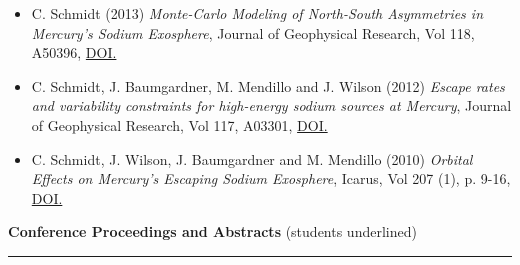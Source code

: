 \documentclass[12pt]{report}
\begin{document}
\begin{itemize}
  \item C. Schmidt (2013) \textit{Monte-Carlo Modeling of North-South Asymmetries in Mercury's Sodium Exosphere}, Journal of Geophysical Research, Vol 118, A50396, \href{https://doi.org/10.1002/jgra.50396}{DOI.}
  \item C. Schmidt, J. Baumgardner, M. Mendillo and J. Wilson (2012) \textit{Escape rates and variability constraints for high-energy sodium sources at Mercury}, Journal of Geophysical Research, Vol 117, A03301, \href{https://doi.org/10.1029/2011JA017217}{DOI.}
  \item C. Schmidt, J. Wilson, J. Baumgardner and M. Mendillo (2010) \textit{Orbital Effects on Mercury's Escaping Sodium Exosphere}, Icarus, Vol 207 (1), p. 9-16, \href{https://doi.org/10.1016/j.icarus.2009.10.017}{DOI.}
 \end{itemize}
\vspace{2 mm}
\noindent\textbf{Conference Proceedings and Abstracts} (students underlined) \rm\hspace*{\fill} \\
\rule{\textwidth}{1pt}
\end{document}
